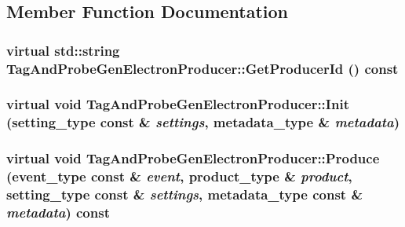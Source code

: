 \subsection{Member Function Documentation}
\hypertarget{classTagAndProbeGenElectronProducer_ab58919b4df408e2a9d59aa68655bd6bc}{
\subsubsection[{GetProducerId}]{\setlength{\rightskip}{0pt plus 5cm}virtual std::string TagAndProbeGenElectronProducer::GetProducerId () const}}
\label{classTagAndProbeGenElectronProducer_ab58919b4df408e2a9d59aa68655bd6bc}
\hypertarget{classTagAndProbeGenElectronProducer_a48e61491e4cf956c1cd5a81219d43d6f}{
\subsubsection[{Init}]{\setlength{\rightskip}{0pt plus 5cm}virtual void TagAndProbeGenElectronProducer::Init (setting\_\-type const \& {\em settings}, \/  metadata\_\-type \& {\em metadata})}}
\label{classTagAndProbeGenElectronProducer_a48e61491e4cf956c1cd5a81219d43d6f}
\hypertarget{classTagAndProbeGenElectronProducer_a8dc74cf238c8f0c32b2e4eadd1879e66}{
\subsubsection[{Produce}]{\setlength{\rightskip}{0pt plus 5cm}virtual void TagAndProbeGenElectronProducer::Produce (event\_\-type const \& {\em event}, \/  product\_\-type \& {\em product}, \/  setting\_\-type const \& {\em settings}, \/  metadata\_\-type const \& {\em metadata}) const}}
\label{classTagAndProbeGenElectronProducer_a8dc74cf238c8f0c32b2e4eadd1879e66}
